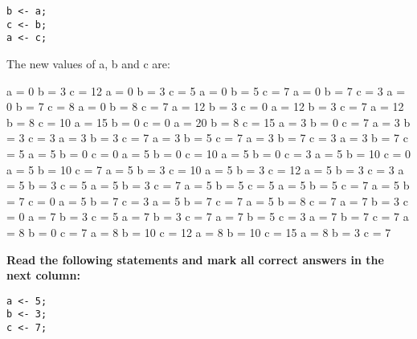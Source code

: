 \documentclass[10pt]{exam}
\begin{document}
\begin{questions}
\begin{minipage}[t][][t]{0.18\textwidth}
\begin{lstlisting}
b <- a;
c <- b;
a <- c;
  \end{lstlisting}
\end{minipage}
  \hfill
\begin{minipage}[t][][t]{0.75\textwidth}
  The new values of a, b and c are:
  \begin{multicols*}{3}
\begin{checkboxes}
    \choice a = 0 b = 3 c = 12
    \choice a = 0 b = 3 c = 5
    \choice a = 0 b = 5 c = 7
    \choice a = 0 b = 7 c = 3
    \choice a = 0 b = 7 c = 8
    \choice a = 0 b = 8 c = 7
    \choice a = 12 b = 3 c = 0
    \choice a = 12 b = 3 c = 7
    \choice a = 12 b = 8 c = 10
    \choice a = 15 b = 0 c = 0
    \choice a = 20 b = 8 c = 15
    \choice a = 3 b = 0 c = 7
    \choice a = 3 b = 3 c = 3
    \choice a = 3 b = 3 c = 7
    \choice a = 3 b = 5 c = 7
    \choice a = 3 b = 7 c = 3
    \choice a = 3 b = 7 c = 5
    \choice a = 5 b = 0 c = 0
    \choice a = 5 b = 0 c = 10
    \choice a = 5 b = 0 c = 3
    \choice a = 5 b = 10 c = 0
    \choice a = 5 b = 10 c = 7
    \choice a = 5 b = 3 c = 10
    \choice a = 5 b = 3 c = 12
    \choice a = 5 b = 3 c = 3
    \choice a = 5 b = 3 c = 5
    \choice a = 5 b = 3 c = 7
    \choice a = 5 b = 5 c = 5
    \choice a = 5 b = 5 c = 7
    \choice a = 5 b = 7 c = 0
    \choice a = 5 b = 7 c = 3
    \choice a = 5 b = 7 c = 7
    \choice a = 5 b = 8 c = 7
    \choice a = 7 b = 3 c = 0
    \choice a = 7 b = 3 c = 5
    \choice a = 7 b = 3 c = 7
    \choice a = 7 b = 5 c = 3
    \choice a = 7 b = 7 c = 7
    \choice a = 8 b = 0 c = 7
    \choice a = 8 b = 10 c = 12
    \choice a = 8 b = 10 c = 15
    \choice a = 8 b = 3 c = 7
  \end{checkboxes}
\end{multicols*}
\end{minipage}

\vspace{1cm}  \begin{minipage}[t][][t]{0.18\textwidth}
\question \bf Read the following statements and mark all correct answers in the next column: \raggedright
  \begin{lstlisting}
a <- 5;
b <- 3;
c <- 7;


\end{lstlisting}
\end{minipage}
\end{questions}
\end{document}
